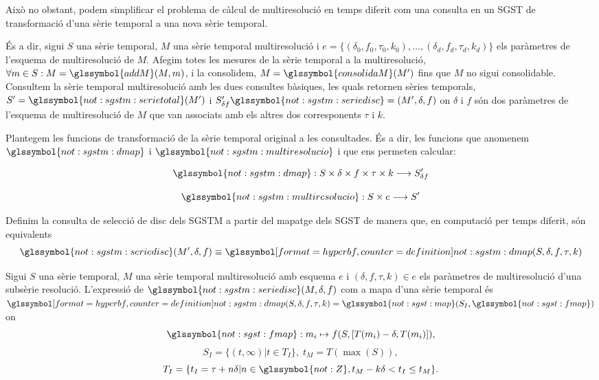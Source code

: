 Això no obstant, podem simplificar el problema de càlcul de
multiresolució en temps diferit com una consulta en un \gls{SGST} de
transformació d'una sèrie temporal a una nova sèrie temporal.

És a dir, sigui $S$ una sèrie temporal, $M$ una sèrie temporal
multiresolució i $e = \{ (\delta_0,f_0,\tau_0,k_0), \ldots,
(\delta_d,f_d,\tau_d,k_d)\}$ els paràmetres de l'esquema de
multiresolució de $M$. Afegim totes les mesures de la sèrie temporal a
la multiresolució, $\forall m \in S:
M=\glssymbol{addM}(M,m)$, i la consolidem, $M=\glssymbol{consolidaM}(M')$ fins que
$M$ no sigui consolidable. Consultem la sèrie temporal multiresolució
amb les dues consultes bàsiques, les quals retornen sèries temporals,
$S'=\glssymbol{not:sgstm:serietotal}(M')$ i $S_{\delta
  f}'\glssymbol{not:sgstm:seriedisc}=(M',\delta,f)$ on $\delta$ i $f$
són dos paràmetres de l'esquema de multiresolució de $M$ que van
associats amb els altres dos corresponents $\tau$ i $k$.



Plantegem les funcions de transformació de la sèrie temporal original
a les consultades. És a dir, les funcions que anomenem
$\glssymbol{not:sgstm:dmap}$ i $\glssymbol{not:sgstm:multiresolucio}$
i que ens permeten calcular:

\[
\glssymbol{not:sgstm:dmap}: S \times \delta \times f \times \tau \times k \longrightarrow
S'_{\delta f}
\]


\[
 \glssymbol{not:sgstm:multiresolucio}: S \times e  \longrightarrow S'
\]



Definim la consulta de selecció de disc dels \gls{SGSTM} a partir del
mapatge dels \gls{SGST} de manera que, en computació per temps
diferit, són equivalents
\[
\glssymbol{not:sgstm:seriedisc}(M',\delta,f) \equiv
\glssymboldef{not:sgstm:dmap}(S,\delta,f,\tau,k)
\]


\begin{definition}
  Sigui $S$ una sèrie temporal, $M$ una sèrie temporal multiresolució
  amb esquema $e$ i $(\delta,f,\tau,k)\in e$ els paràmetres de
  multiresolució d'una subsèrie resolució. L'expressió de
  $\glssymbol{not:sgstm:seriedisc}(M,\delta,f)$ com a mapa d'una sèrie
  temporal és $\glssymboldef{not:sgstm:dmap}(S,\delta,f,\tau,k)=
  \glssymbol{not:sgst:map}(S_I,\glssymbol{not:sgst:fmap})$ on
  \[
  \glssymbol{not:sgst:fmap}: m_i\mapsto f(S, [T(m_i)-\delta,T(m_i)]),
  \]
  \[
  S_I = \{ (t,\infty) | t\in T_I  \},\;  t_M = T(\max(S)),
  \]
  \[
  T_I = \{ t_I = \tau+n\delta | n\in\glssymbol{not:Z}, t_M - k\delta <
  t_I \leq t_M \}.
  \]
\end{definition}



